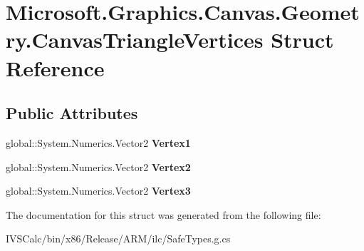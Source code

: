 \hypertarget{struct_microsoft_1_1_graphics_1_1_canvas_1_1_geometry_1_1_canvas_triangle_vertices}{}\section{Microsoft.\+Graphics.\+Canvas.\+Geometry.\+Canvas\+Triangle\+Vertices Struct Reference}
\label{struct_microsoft_1_1_graphics_1_1_canvas_1_1_geometry_1_1_canvas_triangle_vertices}
\subsection*{Public Attributes}
\begin{DoxyCompactItemize}
\item 
\mbox{\label{struct_microsoft_1_1_graphics_1_1_canvas_1_1_geometry_1_1_canvas_triangle_vertices_a7a18def12a5a678f911671fec3cd967b}} 
global\+::\+System.\+Numerics.\+Vector2 {\bfseries Vertex1}
\item 
\mbox{\label{struct_microsoft_1_1_graphics_1_1_canvas_1_1_geometry_1_1_canvas_triangle_vertices_a41d24d1b4a3347fdad5855d27ae6db5e}} 
global\+::\+System.\+Numerics.\+Vector2 {\bfseries Vertex2}
\item 
\mbox{\label{struct_microsoft_1_1_graphics_1_1_canvas_1_1_geometry_1_1_canvas_triangle_vertices_a18e6ad7a4af10cec61d623d2be25a63b}} 
global\+::\+System.\+Numerics.\+Vector2 {\bfseries Vertex3}
\end{DoxyCompactItemize}


The documentation for this struct was generated from the following file\+:\begin{DoxyCompactItemize}
\item 
I\+V\+S\+Calc/bin/x86/\+Release/\+A\+R\+M/ilc/Safe\+Types.\+g.\+cs\end{DoxyCompactItemize}
